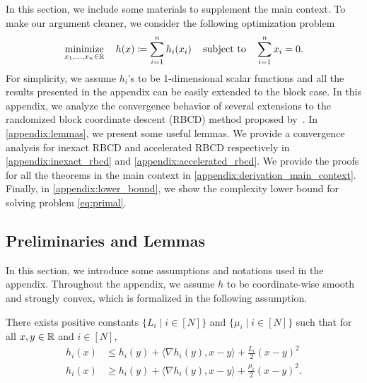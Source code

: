In this section, we include some materials to supplement the main context. To make our argument cleaner, we consider the following optimization problem 
\begin{align}
    \displaystyle\mathop{\hbox{\rm minimize}}_{x_1, \dots, x_n \in \mathbb{R}}\enspace\enspace h(x) \coloneqq \sum_{i=1}^n h_i(x_i) \enspace\enspace\mathop{\hbox{\rm subject to}}\enspace\enspace \sum_{i=1}^n x_i = 0 \label{eq:CDObj}.
\end{align}
For simplicity, we assume $h_i$'s to be 1-dimensional scalar functions and all the results presented in the appendix can be easily extended to the block case. In this appendix, we analyze the convergence behavior of several extensions to the randomized block coordinate descent (RBCD) method proposed by~\citet{necoara2017random}. In \autoref{appendix:lemmas}, we present some useful lemmas. We provide a convergence analysis for inexact RBCD and accelerated RBCD respectively in \autoref{appendix:inexact_rbcd} and \autoref{appendix:accelerated_rbcd}. We provide the proofs for all the theorems in the main context in \autoref{appendix:derivation_main_context}. Finally, in \autoref{appendix:lower_bound}, we show the complexity lower bound for solving problem \eqref{eq:primal}. 

\subsection{Preliminaries and Lemmas} \label{appendix:lemmas}
In this section, we introduce some assumptions and notations used in the appendix. 
Throughout the appendix, we assume $h$ to be coordinate-wise smooth and strongly convex, which is formalized in the following assumption. 
\begin{assumption} \label{ass:hStruncture} 
  There exists positive constants $\{L_i \mid i \in [N]\}$ and $\{\mu_i \mid i \in [N]\}$ such that for all $x,y \in \mathbb{R}$ and $i \in [N]$, 
  \begin{align}
      h_i(x) &\leq h_i(y) + \langle \nabla h_i(y), x - y \rangle + \frac{L_i}{2} (x - y)^2 \tag{smoothnes}
      \\ h_i(x) &\geq h_i(y) + \langle \nabla h_i(y), x - y \rangle + \frac{\mu_i}{2} (x - y)^2 \tag{strong convexity}.
  \end{align}
\end{assumption}

